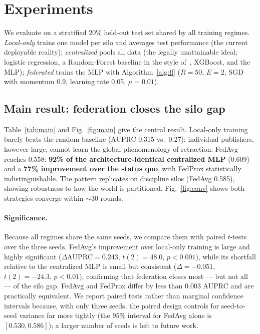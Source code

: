 \documentclass[review,12pt]{elsarticle}
\begin{document}
\section{Experiments}
\label{sec:experiments}
We evaluate on a stratified 20\% held-out test set shared by all training
regimes. \emph{Local-only} trains one model per silo and averages test
performance (the current deployable reality); \emph{centralized} pools all
data (the legally unattainable ideal; logistic regression, a Random-Forest
baseline in the style of~\cite{ref_usman_websci25}, XGBoost, and the MLP);
\emph{federated} trains the MLP with Algorithm~\ref{alg:fl}
($R{=}50$, $E{=}2$, SGD with momentum 0.9, learning rate 0.05, $\mu{=}0.01$).

\subsection{Main result: federation closes the silo gap}
\label{sec:main}
Table~\ref{tab:main} and Fig.~\ref{fig:main} give the central result.
Local-only training barely beats the random baseline (AUPRC 0.315 vs.\ 0.27):
individual publishers, however large, cannot learn the global phenomenology of
retraction. FedAvg reaches 0.558: \textbf{92\% of the architecture-identical
centralized MLP} (0.609) and a \textbf{77\% improvement over the status quo},
with FedProx statistically indistinguishable. The pattern replicates on
discipline silos (FedAvg 0.585), showing robustness to how the world is
partitioned. Fig.~\ref{fig:conv} shows both strategies converge within
$\sim$30 rounds.

\paragraph{Significance.}
Because all regimes share the same seeds, we compare them with paired
$t$-tests over the three seeds. FedAvg's improvement over local-only training
is large and highly significant ($\Delta\mathrm{AUPRC}{=}0.243$,
$t(2){=}48.0$, $p{<}0.001$), while its shortfall relative to the centralized
MLP is small but consistent ($\Delta{=}{-}0.051$, $t(2){=}{-}24.3$,
$p{<}0.01$), confirming that federation closes most --- but not all --- of the
silo gap. FedAvg and FedProx differ by less than $0.003$ AUPRC and are
practically equivalent. We report paired tests rather than marginal confidence
intervals because, with only three seeds, the paired design controls for
seed-to-seed variance far more tightly (the $95\%$ interval for FedAvg alone is
$[0.530, 0.586]$); a larger number of seeds is left to future work.
\end{document}
